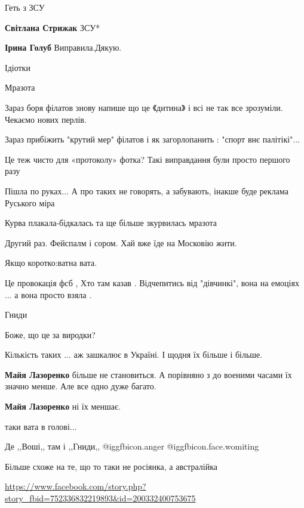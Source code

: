 \begin{itemize}
Геть з ЗСУ

\begin{itemize} %
\textbf{Світлана Стрижак} ЗСУ*

\textbf{Ірина Голуб} Виправила.Дякую.
\end{itemize} %

Ідіотки

Мразота

Зараз боря філатов знову напише що це 《дитина》 і всі не так все зрозуміли. Чекаємо нових перлів.

Зараз прибіжить "крутий мер" філатов і як загорлопанить : "спорт внє палітікі"...

Це теж чисто для «протоколу» фотка? Такі виправдання були просто першого разу

Пішла по руках... А про таких не говорять, а забувають, інакше буде реклама Руського міра

Курва плакала-бідкалась та ще більше зкурвилась мразота

Другий раз. Фейспалм і сором. Хай вже їде на Московію жити.

Якщо коротко:ватна вата.

Це провокація фсб , Хто там казав . Відчепитись від "дівчинкі", вона на емоціях ... а вона просто взяла .

Гниди

Боже, що це за виродки?

Кількість таких ... аж зашкалює в Україні. І щодня їх більше і більше.

\begin{itemize} %
\textbf{Майя Лазоренко} більше не становиться. А порівняно з до военими часами їх значно менше. Але все одно дуже багато.

\textbf{Майя Лазоренко} ні їх меншає.
\end{itemize} %

таки вата в голові...

Де ,,Воші,, там і ,,Гниди,,  @igg{fbicon.anger}  @igg{fbicon.face.womiting} 

Більше схоже на те, що то таки не росіянка, а австралійка\par
\url{https://www.facebook.com/story.php?story_fbid=752336832219893&id=200332400753675}


\end{itemize}
